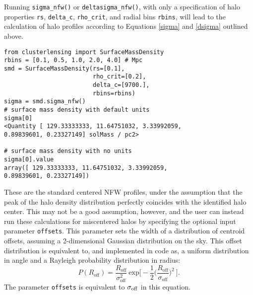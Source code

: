 \documentclass[twocolumn]{aastex6}
\newcommand{\code}{\lstinline[style=codeintext]}
\begin{document}
Running \code{sigma_nfw()} or \code{deltasigma_nfw()}, with only a specification of halo properties \code{rs}, \code{delta_c}, \code{rho_crit}, and radial bins \code{rbins}, will lead to the calculation of halo profiles according to Equations \ref{sigma} and \ref{dsigma} outlined above. 

\begin{lstlisting}
from clusterlensing import SurfaceMassDensity
rbins = [0.1, 0.5, 1.0, 2.0, 4.0] # Mpc
smd = SurfaceMassDensity(rs=[0.1], 
                         rho_crit=[0.2], 
                         delta_c=[9700.], 
                         rbins=rbins)
sigma = smd.sigma_nfw()
# surface mass density with default units
sigma[0]
<Quantity [ 129.33333333, 11.64751032, 3.33992059, 
0.89839601, 0.23327149] solMass / pc2>

# surface mass density with no units
sigma[0].value
array([ 129.33333333, 11.64751032, 3.33992059, 
0.89839601, 0.23327149])
\end{lstlisting}

These are the standard centered NFW profiles, under the assumption that the peak of the halo density distribution perfectly coincides with the identified halo center. This may not be a good assumption, however, and the user can instead run these calculations for miscentered halos by specifying the optional input parameter \code{offsets}. This parameter sets the width of a distribution of centroid offsets, assuming a 2-dimensional Gaussian distribution on the sky. This offset distribution is equivalent to, and implemented in code as, a uniform distribution in angle and a Rayleigh probability distribution in radius:
\begin{equation}\label{PofR}
P(R_{\mathrm{off}})=\frac{R_{\mathrm{off}}}{\sigma_{\mathrm{off}}^2}\ \mathrm{exp}\bigg[-\frac{1}{2}\bigg(\frac{R_{\mathrm{off}}}{\sigma_{\mathrm{off}}}\bigg)^2\ \bigg].
\end{equation}
The parameter \code{offsets} is equivalent to $\sigma_{\rm off}$ in this equation.
\end{document}
